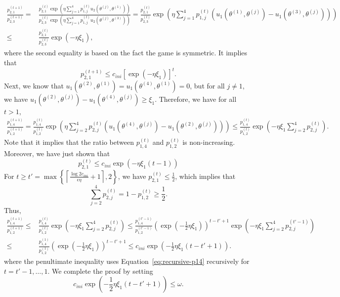 \begin{equation*}
\begin{split}
    \frac{p^{(t+1)}_{2,1}}{p^{(t+1)}_{2,3}}  = {} & \frac{p^{(t)}_{2,1}\exp\left(\eta \sum_{j=1}^4 p_{1,j}^{(t)}u_2\left(\theta^{(j)},\theta^{(1)}\right) \right)}{p^{(t)}_{2,3}\exp\left(\eta \sum_{j=1}^4 p_{1,j}^{(t)}u_2\left(\theta^{(j)},\theta^{(3)}\right) \right)} = \frac{p_{2,1}^{(t)}}{p_{2,3}^{(t)}}\exp\left(\eta \sum_{j=1}^4p_{1,j}^{(t)}\left(u_1\left(\theta^{(1)},\theta^{(j)}\right)-u_1\left(\theta^{(3)},\theta^{(j)}\right)\right)\right) \\
\leq {} &  \frac{p_{2,1}^{(t)}}{p_{2,3}^{(t)}}\exp\left(-\eta\xi_1\right),
\end{split}
\end{equation*}
where the second equality is based on the fact the game is symmetric. It implies that 
\[
{p^{(t+1)}_{2,1}}\leq c_{ini}\left[\exp\left(-\eta\xi_1\right)\right]^{t}.
\]
Next, we know that $u_1(\theta^{(2)},\theta^{(1)})=u_1(\theta^{(4)},\theta^{(1)})=0$, but for all $j \neq 1$, we have $u_1\left(\theta^{(2)},\theta^{(j)}\right) - u_1\left(\theta^{(4)},\theta^{(j)}\right) \geq \xi_1$. Therefore, we have for all $t>1$,
\begin{equation}\label{eq:recursive-p14}
   \begin{split}
\frac{p^{(t+1)}_{1,4}}{p^{(t+1)}_{1,2}} =      \frac{p^{(t)}_{1,4}}{p^{(t)}_{1,2}} \exp\left(\eta \sum_{j=2}^4 p^{(t)}_{2,j}\left(u_1\left(\theta^{(4)},\theta^{(j)}\right)-u_1\left(\theta^{(2)},\theta^{(j)}\right)\right) \right)\leq \frac{p^{(t)}_{1,4}}{p^{(t)}_{1,2}} \exp\left(-\eta \xi_1\sum_{j=2}^4 p^{(t)}_{2,j} \right).
   \end{split} 
\end{equation}
Note that it implies that the ratio between $p_{1,4}^{(t)}$ and $p_{1,2}^{(t)}$ is non-increasing. Moreover, we have just shown that
\[
p_{2,1}^{(t)}\leq c_{ini}\exp\left(-\eta\xi_1(t-1)\right)
\]
For $t\geq t'=\max\left\{\left\lceil\frac{\log 2c_{ini}}{\epsilon\eta}+1\right\rceil,2\right\}$, we have $p_{2,1}^{(t)}\leq \frac{1}{2}$, which implies that 
\[
\sum_{j=2}^4p_{2,j}^{(t)}= 1- p_{1,2}^{(t)}\geq\frac{1}{2}.
\] 
Thus, 
\begin{equation*}
    \begin{split}
 \frac{p^{(t+1)}_{1,4}}{p^{(t+1)}_{1,2}}\leq {} &  \frac{p^{(t)}_{1,4}}{p^{(t)}_{1,2}} \exp\left(-\eta \xi_1\sum_{j=2}^4 p^{(t)}_{2,j} \right)\leq \frac{p^{(t'-1)}_{1,4}}{p^{(t'-1)}_{1,2}} \left(\exp\left(-\frac{1}{2}\eta \xi_1 \right)\right)^{t-t'+1}\exp\left(-\eta\xi_1\sum_{j=2}^4p_{2,j}^{(t'-1)}\right)\\
\leq {} &\frac{p^{(1)}_{1,4}}{p^{(1)}_{1,2}} \left(\exp\left(-\frac{1}{2}\eta \xi_1 \right)\right)^{t-t'+1}\leq c_{ini}\exp\left(-\frac{1}{2}\eta \xi_1(t-t'+1) \right).       
    \end{split}
\end{equation*}
where the penultimate inequality uses Equation~\eqref{eq:recursive-p14} recursively for $t = t' - 1, \ldots, 1$. We complete the proof by setting 
$$c_{ini}\exp\left(-\frac{1}{2}\eta \xi_1(t-t'+1) \right)\leq\omega. $$


